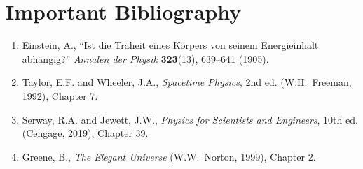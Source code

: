 \section*{Important Bibliography}

\begin{enumerate}
\item Einstein, A., ``Ist die Tr\"aheit eines K\"orpers von seinem Energieinhalt abh\"angig?'' \textit{Annalen der Physik} \textbf{323}(13), 639--641 (1905).
\item Taylor, E.F. and Wheeler, J.A., \textit{Spacetime Physics}, 2nd ed. (W.H.\ Freeman, 1992), Chapter 7.
\item Serway, R.A. and Jewett, J.W., \textit{Physics for Scientists and Engineers}, 10th ed. (Cengage, 2019), Chapter 39.
\item Greene, B., \textit{The Elegant Universe} (W.W.\ Norton, 1999), Chapter 2.
\end{enumerate}


